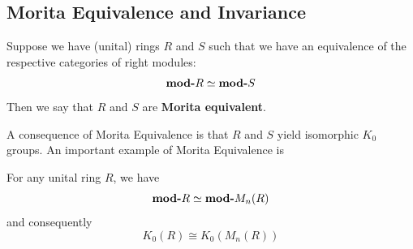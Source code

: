 %
%
%
%

\subsection{Morita Equivalence and Invariance}

Suppose we have (unital) rings $R$ and $S$ such that we have an equivalence of the respective categories of right modules:
\begin{align*}
  \textbf{mod-}R \simeq \textbf{mod-}S
\end{align*}
Then we say that $R$ and $S$ are \textbf{Morita equivalent}.

A consequence of Morita Equivalence is that $R$ and $S$ yield isomorphic $K_0$ groups.
An important example of Morita Equivalence is 

\begin{proposition}
For any unital ring $R$, we have
  \[\textbf{mod-}R \simeq \textbf{mod-}M_n(R)\]
and consequently
\[
K_0(R) \cong K_0(M_n(R))
\]
\end{proposition}

